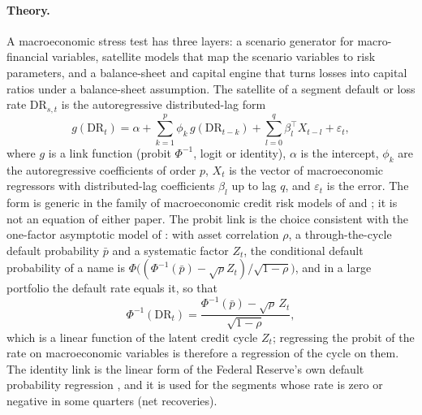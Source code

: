\paragraph{Theory.}
A macroeconomic stress test has three layers: a scenario generator for macro-financial variables, satellite models that map the
scenario variables to risk parameters, and a balance-sheet and capital engine that turns losses into capital ratios under a
balance-sheet assumption. The satellite of a segment default or loss rate
$\mathrm{DR}_{s,t}$ is the autoregressive distributed-lag form
\begin{equation}
g(\mathrm{DR}_{t})=\alpha+\sum_{k=1}^{p}\phi_k\,g(\mathrm{DR}_{t-k})+\sum_{l=0}^{q}\beta_l^{\top}X_{t-l}+\varepsilon_t,
\label{eq:st-ardl}
\end{equation}
where $g$ is a link function (probit $\Phi^{-1}$, logit or identity), $\alpha$ is the intercept, $\phi_k$ are the autoregressive
coefficients of order $p$, $X_t$ is the vector of macroeconomic regressors with distributed-lag coefficients $\beta_l$ up to lag
$q$, and $\varepsilon_t$ is the error. The form is generic in the family of macroeconomic credit risk models of
\citet{aggregation-stress:wilson1998} and \citet{aggregation-stress:virolainen2004}; it is not an equation of either paper. The
probit link is the choice consistent with the one-factor asymptotic model of \citet{ratings:gordy2003}: with asset
correlation $\rho$, a through-the-cycle default probability $\bar p$ and a systematic factor $Z_t$, the conditional default
probability of a name is $\Phi\bigl((\Phi^{-1}(\bar p)-\sqrt{\rho}Z_t)/\sqrt{1-\rho}\bigr)$, and in a large portfolio the default
rate equals it, so that
\begin{equation}
\Phi^{-1}(\mathrm{DR}_t)=\frac{\Phi^{-1}(\bar p)-\sqrt{\rho}\,Z_t}{\sqrt{1-\rho}},
\label{eq:st-vasicek}
\end{equation}
which is a linear function of the latent credit cycle $Z_t$; regressing the probit of the rate on macroeconomic variables is
therefore a regression of the cycle on them. The identity link is the linear form of the Federal Reserve's own default
probability regression \citep{aggregation-stress:fedcredit2026}, and it is used for the segments whose rate is zero or negative in some quarters (net recoveries).


